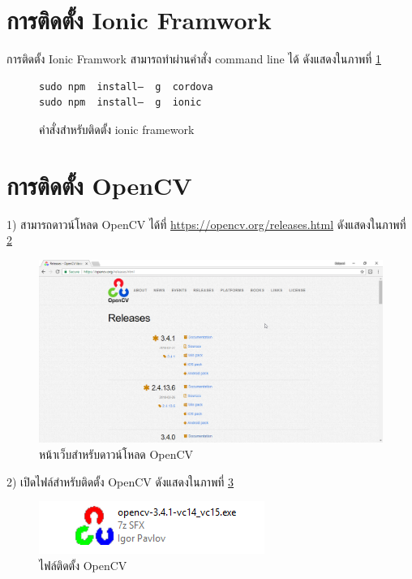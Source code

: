 \section{การติดตั้ง Ionic Framwork}

    การติดตั้ง Ionic Framwork สามารถทำผ่านคำสั่ง command line ได้ ดังแสดงในภาพที่ \ref{Fig:ionicInstall}
    \begin{figure}[H]
		{\begin{lstlisting}[numbers=none]
sudo npm  install–  g  cordova  
sudo npm  install–  g  ionic                
		\end{lstlisting}}
		\caption{คำสั่งสำหรับติดตั้ง ionic framework}
		\label{Fig:ionicInstall}
    \end{figure}
    
\section{การติดตั้ง OpenCV}
    1) สามารถดาวน์โหลด OpenCV ได้ที่ \url{https://opencv.org/releases.html} ดังแสดงในภาพที่ \ref{Fig:opencvInstall1}
      \begin{figure}[H]
          \includegraphics[width=\columnwidth]{Figures/7/7}
          \caption{หน้าเว็บสำหรับดาวน์โหลด OpenCV}
          \label{Fig:opencvInstall1}
      \end{figure}

    2) เปิดไฟล์สำหรับติดตั้ง OpenCV ดังแสดงในภาพที่ \ref{Fig:opencvInstall2}
      \begin{figure}[H]
          \includegraphics[width=\columnwidth]{Figures/7/8}
          \caption{ไฟล์ติดตั้ง OpenCV}
          \label{Fig:opencvInstall2}
      \end{figure}

